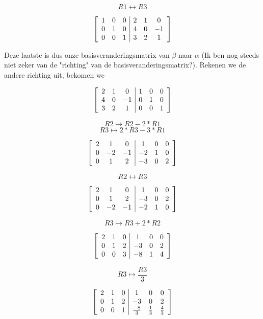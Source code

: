 \documentclass[lineaire_algebra_oplossingen.tex]{subfiles}
\begin{document}
\[R1 \leftrightarrow R3 \]

\[
\left[
\begin{array}{ c c c | c c c }
1 & 0 & 0 & 2 & 1 & 0\\
0 & 1 & 0 & 4 & 0 & -1\\
0 & 0 & 1 & 3 & 2 & 1
\end{array}
\right]
\]

Deze laatste is dus onze basisveranderingsmatrix van $\beta$ naar $\alpha$ (Ik ben nog steeds niet zeker van de "richting" van de basisveranderingsmatrix?). Rekenen we de andere richting uit, bekomen we

\[
\left[
\begin{array}{ c c c | c c c }
2 & 1 & 0 & 1 & 0 & 0\\
4 & 0 & -1 & 0 & 1 & 0\\
3 & 2 & 1 & 0 & 0 & 1
\end{array}
\right]
\]

\[R2 \mapsto R2 - 2*R1 \]
\[R3 \mapsto 2*R3 - 3*R1 \]

\[
\left[
\begin{array}{ c c c | c c c }
2 & 1 & 0 & 1 & 0 & 0\\
0 & -2 & -1 & -2 & 1 & 0\\
0 & 1 & 2 & -3 & 0 & 2
\end{array}
\right]
\]

\[R2 \leftrightarrow R3 \]

\[
\left[
\begin{array}{ c c c | c c c }
2 & 1 & 0 & 1 & 0 & 0\\
0 & 1 & 2 & -3 & 0 & 2\\
0 & -2 & -1 & -2 & 1 & 0
\end{array}
\right]
\]

\[R3 \mapsto R3 + 2*R2 \]

\[
\left[
\begin{array}{ c c c | c c c }
2 & 1 & 0 & 1 & 0 & 0\\
0 & 1 & 2 & -3 & 0 & 2\\
0 & 0 & 3 & -8 & 1 & 4
\end{array}
\right]
\]

\[R3 \mapsto \frac{R3}{3} \]

\[
\left[
\begin{array}{ c c c | c c c }
2 & 1 & 0 & 1 & 0 & 0\\
0 & 1 & 2 & -3 & 0 & 2\\
0 & 0 & 1 & \frac{-8}{3} & \frac{1}{3} & \frac{4}{3}
\end{array}
\right]
\]
\end{document}
